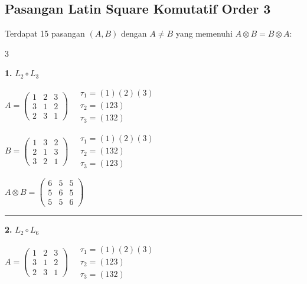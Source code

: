 
\subsection*{Pasangan Latin Square Komutatif Order 3}

Terdapat 15 pasangan $(A, B)$ dengan $A \neq B$ yang memenuhi $A \otimes B = B \otimes A$:

\begin{multicols}{3}
\small

\noindent\textbf{1.} $L_{2} \circ L_{3}$

$A = \begin{pmatrix} 1 & 2 & 3 \\ 3 & 1 & 2 \\ 2 & 3 & 1 \end{pmatrix} \quad \begin{matrix} \tau_{1}=(1)(2)(3) \\ \tau_{2}=(1 2 3) \\ \tau_{3}=(1 3 2) \end{matrix}$

$B = \begin{pmatrix} 1 & 3 & 2 \\ 2 & 1 & 3 \\ 3 & 2 & 1 \end{pmatrix} \quad \begin{matrix} \tau_{1}=(1)(2)(3) \\ \tau_{2}=(1 3 2) \\ \tau_{3}=(1 2 3) \end{matrix}$

$A \otimes B = \begin{pmatrix} 6 & 5 & 5 \\ 5 & 6 & 5 \\ 5 & 5 & 6 \end{pmatrix}$

\vspace{0.3em}
\hrule
\vspace{0.3em}

\noindent\textbf{2.} $L_{2} \circ L_{6}$

$A = \begin{pmatrix} 1 & 2 & 3 \\ 3 & 1 & 2 \\ 2 & 3 & 1 \end{pmatrix} \quad \begin{matrix} \tau_{1}=(1)(2)(3) \\ \tau_{2}=(1 2 3) \\ \tau_{3}=(1 3 2) \end{matrix}$


\end{multicols}

